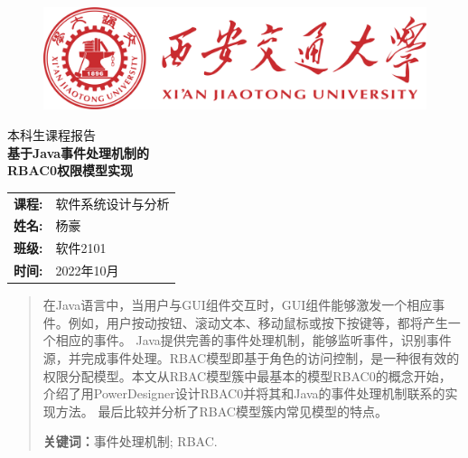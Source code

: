 \documentclass[12pt, a4paper, oneside]{ctexart}
\begin{document}
\thispagestyle{empty}

\begin{figure}[t]
    \centering
    \includegraphics[width=13cm]{../pic/xjtu.png}
\end{figure}

\vspace*{\fill}
    \begin{center}
        \centering
        \vspace{-3cm}
        \fangsong\huge{本科生课程报告} \\\kaishu \Huge{\textbf{基于Java事件处理机制的\\RBAC0权限模型实现}}
    \end{center}
\vspace*{\fill}

\begin{table}[b]
    \centering
    \large
    \begin{tabular}{ll}
        \textbf{课程:} & 软件系统设计与分析 \\
        \textbf{姓名:} & 杨豪 \\
        \textbf{班级:} & 软件2101 \\
        \textbf{时间:} & 2022年10月 \\
    \end{tabular}
\end{table}

\newpage

\thispagestyle{empty}
\begin{abstract}
    在Java语言中，当用户与GUI组件交互时，GUI组件能够激发一个相应事件。例如，用户按动按钮、滚动文本、移动鼠标或按下按键等，都将产生一个相应的事件。
    Java提供完善的事件处理机制，能够监听事件，识别事件源，并完成事件处理。RBAC模型即基于角色的访问控制，是一种很有效的权限分配模型。本文从RBAC模型簇中最基本的模型RBAC0的概念开始，
    介绍了用PowerDesigner设计RBAC0并将其和Java的事件处理机制联系的实现方法。
    最后比较并分析了RBAC模型簇内常见模型的特点。
    \par\textbf{关键词：}事件处理机制; RBAC. 
\end{abstract}

\newpage
{}
\setcounter{page}{1}
\thispagestyle{plain}
\tableofcontents
\newpage
\setcounter{page}{1}
\end{document}
